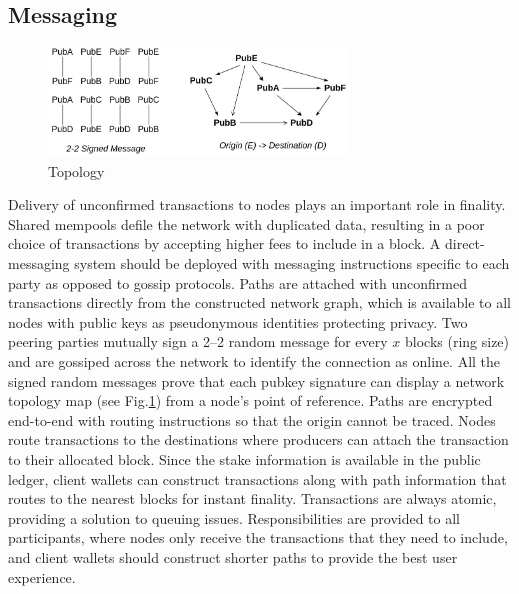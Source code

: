 \documentclass[a4paper,10pt]{article}
\begin{document}
\subsection{Messaging}
\begin{figure}[h]
\begin{center}
\includegraphics[width=8cm]{topology}
\caption{Topology}
\label{topology}
\end{center}
\end{figure}
Delivery of unconfirmed transactions to nodes plays an important role in finality. Shared mempools defile the network with duplicated data, resulting in a poor choice of transactions by accepting higher fees to include in a block. A direct-messaging system should be deployed with messaging instructions specific to each party as opposed to gossip protocols. Paths are attached with unconfirmed transactions directly from the constructed network graph, which is available to all nodes with public keys as pseudonymous identities protecting privacy. Two peering parties mutually sign a 2–2 random message for every $x$ blocks (ring size) and are gossiped across the network to identify the connection as online. All the signed random messages prove that each pubkey signature can display a network topology map (see Fig.\ref{topology}) from a node's point of reference. Paths are encrypted end-to-end with routing \cite{poon2016bitcoin} instructions so that the origin cannot be traced. Nodes route transactions to the destinations where producers can attach the transaction to their allocated block. Since the stake information is available in the public ledger, client wallets can construct transactions along with path information that routes to the nearest blocks for instant finality. Transactions are always atomic, providing a solution to queuing issues. Responsibilities are provided to all participants, where nodes only receive the transactions that they need to include, and client wallets should construct shorter paths to provide the best user experience.
\end{document}

